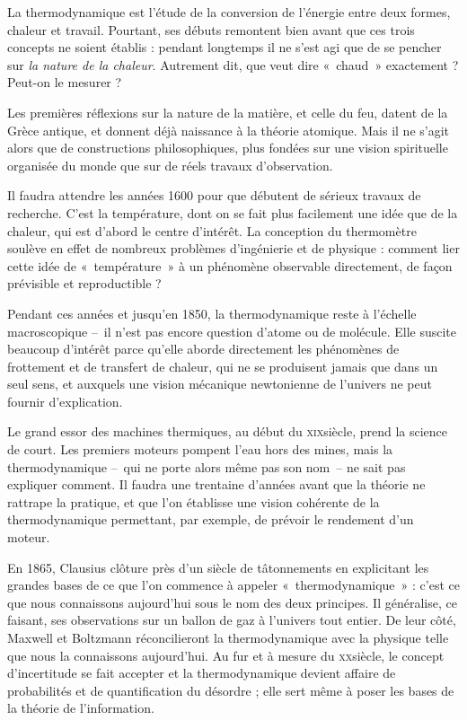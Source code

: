 La thermodynamique est l’étude de la conversion de l’énergie entre deux formes, chaleur et travail. Pourtant, ses débuts remontent bien avant que ces trois concepts ne soient établis : pendant longtemps il ne s’est agi que de se pencher sur \emph{la nature de la chaleur}. Autrement dit, que veut dire «~chaud~» exactement ? Peut-on le mesurer ?

Les premières réflexions sur la nature de la matière, et celle du feu, datent de la Grèce antique, et donnent déjà naissance à la théorie atomique. Mais il ne s’agit alors que de constructions philosophiques, plus fondées sur une vision spirituelle organisée du monde que sur de réels travaux d’observation.

Il faudra attendre les années 1600 pour que débutent de sérieux travaux de recherche. C’est la température, dont on se fait plus facilement une idée que de la chaleur, qui est d’abord le centre  d’intérêt. La conception du thermomètre soulève en effet de nombreux problèmes d’ingénierie et de physique : comment lier cette idée de «~température~» à un phénomène observable directement, de façon prévisible et reproductible ?

Pendant ces années et jusqu’en 1850, la thermodynamique reste à l’échelle macroscopique –~il n’est pas encore question d’atome ou de molécule. Elle suscite beaucoup d’intérêt parce qu’elle aborde directement les phénomènes de frottement et de transfert de chaleur, qui ne se produisent jamais que dans un seul sens, et auxquels une vision mécanique newtonienne de l’univers ne peut fournir d’explication.

Le grand essor des machines thermiques, au début du \textsc{xix}\ieme siècle, prend la science de court. Les premiers moteurs pompent l’eau hors des mines, mais la thermodynamique –\ qui ne porte alors même pas son nom\ – ne sait pas expliquer comment. Il faudra une trentaine d’années avant que la théorie ne rattrape la pratique, et que l’on établisse une vision cohérente de la thermodynamique permettant, par exemple, de prévoir le rendement d’un moteur.

En 1865, Clausius clôture près d’un siècle de tâtonnements en explicitant les grandes bases de ce que l’on commence à appeler «~thermodynamique~» : c’est ce que nous connaissons aujourd’hui sous le nom des deux principes. Il généralise, ce faisant, ses observations sur un ballon de gaz à l’univers tout entier. 
De leur côté, Maxwell et Boltzmann réconcilieront la thermodynamique avec la physique telle que nous la connaissons aujourd’hui. Au fur et à mesure du \textsc{xx}\ieme siècle, le concept d’incertitude se fait accepter et la thermodynamique devient affaire de probabilités et de quantification du désordre ; elle sert même à poser les bases de la théorie de l’information.

